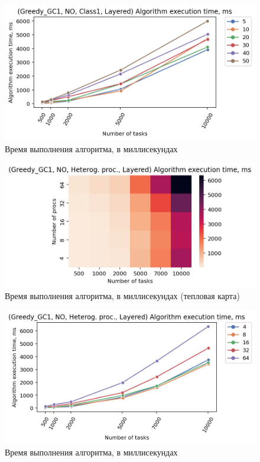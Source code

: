 \begin{figure}[!htbp]
    \centering
    \includegraphics[width=\textwidth]{imgs/layered_class_1/NO/tr_graph.png}
    \caption{Время выполнения алгоритма, в миллисекундах}
    \label{fig:NO-layered-exec-time-compiled}
\end{figure}

\begin{figure}[!htbp]
    \centering
    \includegraphics[width=\textwidth]{imgs/unbalanced/NO/et_heatmap.png}
    \caption{Время выполнения алгоритма, в миллисекундах (тепловая карта)}
    \label{fig:NO-unbalanced-exec-time-heatmap}
\end{figure}

\begin{figure}[!htbp]
    \centering
    \includegraphics[width=\textwidth]{imgs/unbalanced/NO/tr_graph.png}
    \caption{Время выполнения алгоритма, в миллисекундах}
    \label{fig:NO-unbalanced-exec-time-compiled}
\end{figure}

